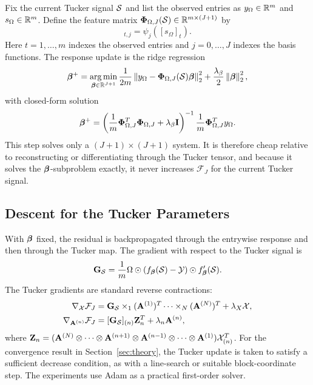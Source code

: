 Fix the current Tucker signal $\mathcal{S}$ and list the observed entries as
$y_\Omega\in\mathbb{R}^m$ and $s_\Omega\in\mathbb{R}^m$. Define the feature matrix
$\boldsymbol{\Phi}_{\Omega,J}(\mathcal{S})\in\mathbb{R}^{m\times(J+1)}$ by
\begin{equation}
  [\bPhi_{\Omega,J}(\cS)]_{t,j}=\psi_j([s_\Omega]_t).
\end{equation}
Here $t=1,\ldots,m$ indexes the observed entries and
$j=0,\ldots,J$ indexes the basis functions.
The response update is the ridge regression
\begin{equation}
  \boldsymbol{\beta}^+
  =
  \operatorname*{arg\,min}_{\boldsymbol{\beta}\in\mathbb{R}^{J+1}}
  \frac{1}{2m}
  \left\lVert y_\Omega-\boldsymbol{\Phi}_{\Omega,J}(\mathcal{S})\boldsymbol{\beta} \right\rVert_2^2
  +
  \frac{\lambda_\beta}{2}\left\lVert \boldsymbol{\beta} \right\rVert_2^2,
  \label{eq:link_refresh_problem}
\end{equation}
with closed-form solution
\begin{equation}
  \boldsymbol{\beta}^+
  =
  \left(
  \frac{1}{m}\boldsymbol{\Phi}_{\Omega,J}^{T}\boldsymbol{\Phi}_{\Omega,J}
  +\lambda_\beta \mathbf{I}
  \right)^{-1}
  \frac{1}{m}\boldsymbol{\Phi}_{\Omega,J}^{T}y_\Omega.
  \label{eq:link_refresh_solution}
\end{equation}
This step solves only a $(J+1)\times(J+1)$ system. It is therefore cheap
relative to reconstructing or differentiating through the Tucker tensor, and
because it solves the $\boldsymbol{\beta}$-subproblem exactly, it never increases
$\mathcal{F}_J$ for the current Tucker signal.

\subsection{Descent for the Tucker Parameters}

With $\boldsymbol{\beta}$ fixed, the residual is backpropagated through the entrywise response
and then through the Tucker map. The gradient with respect to the Tucker signal
is
\begin{equation}
  \mathbf{G}_{\mathcal{S}}
  =
  \frac{1}{m}
  \Omega\odot
  \left(f_{\boldsymbol{\beta}}(\mathcal{S})-\mathcal{Y}\right)
  \odot f_{\boldsymbol{\beta}}'(\mathcal{S}).
  \label{eq:latent_gradient}
\end{equation}
The Tucker gradients are standard reverse contractions:
\begin{align}
  \nabla_{\mathcal{X}}\mathcal{F}_J
  &=
  \mathbf{G}_{\mathcal{S}}
  \times_1 (\mathbf{A}^{(1)})^T
  \cdots
  \times_N (\mathbf{A}^{(N)})^T
  +\lambda_X\mathcal{X}, \\
  \nabla_{\mathbf{A}^{(n)}}\mathcal{F}_J
  &=
  [\mathbf{G}_{\mathcal{S}}]_{(n)}
  \mathbf{Z}_n^T
  +
  \lambda_n\mathbf{A}^{(n)},
  \label{eq:factor_gradient}
\end{align}
where
$\mathbf{Z}_n=(\mathbf{A}^{(N)}\otimes\cdots\otimes\mathbf{A}^{(n+1)}\otimes
\mathbf{A}^{(n-1)}\otimes\cdots\otimes\mathbf{A}^{(1)})\mathcal{X}_{(n)}^T$.
For the convergence result in Section~\ref{sec:theory}, the Tucker update is
taken to satisfy a sufficient decrease condition, as with a line-search or
suitable block-coordinate step. The experiments use Adam as a practical
first-order solver.


